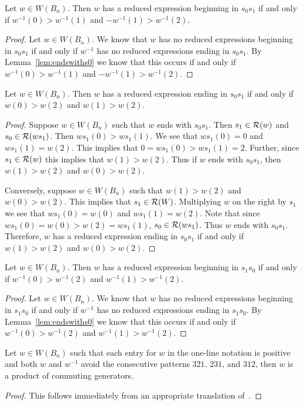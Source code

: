 \begin{corollary}\label{lem:beginswiths0}
	Let $w \in W(B_n)$. Then $w$ has a reduced expression beginning in $s_0s_1$ if and only if $w^{-1}(0)>w^{-1}(1)$ and $-w^{-1}(1)>w^{-1}(2)$.
	\begin{proof}
		Let $w \in W(B_n)$. We know that $w$ has no reduced expressions beginning in $s_0s_1$ if and only if $w^{-1}$ has no reduced expressions ending in $s_0s_1$. By Lemma~\ref{lem:endswiths0} we know that this occurs if and only if $w^{-1}(0)>w^{-1}(1)$ and $-w^{-1}(1)>w^{-1}(2)$.
	\end{proof}
\end{corollary}

\begin{lemma}\label{lem:endswiths_1}
Let $w \in W(B_n)$. Then $w$ has a reduced expression ending in $s_0s_1$ if and only if $w(0)>w(2)$ and $w(1)>w(2)$.
\begin{proof}
	Suppose $w \in W(B_n)$ such that $w$ ends with $s_0s_1$. Then $s_1 \in \mathcal{R}(w)$ and $s_0 \in \mathcal{R}(ws_1)$. Then $ws_1(0)>ws_1(1)$. We see that $ws_1(0)=0$ and $ws_1(1)=w(2)$. This implies that $0=ws_1(0)>ws_1(1)=2$. Further, since $s_1 \in \mathcal{R}(w)$ this implies that $w(1) > w(2)$. Thus if $w$ ends with $s_0s_1$, then $w(1)>w(2)$ and $w(0)>w(2)$.
	
	Conversely, suppose $w \in W(B_n)$ such that $w(1)>w(2)$ and $w(0)>w(2)$. This implies that $s_1 \in \mathcal{R}(W)$. Multiplying $w$ on the right by $s_1$ we see that $ws_1(0)=w(0)$ and $ws_1(1)=w(2)$. Note that since $ws_1(0)=w(0)>w(2)=ws_1(1)$, $s_0 \in \mathcal{R}(ws_1)$. Thus $w$ ends with $s_0s_1$. Therefore, $w$ has a reduced expression ending in $s_0s_1$ if and only if $w(1)>w(2)$ and $w(0)>w(2)$.
\end{proof}	
\end{lemma}

\begin{corollary}\label{lem:beginswiths1}
	Let $w \in W(B_n)$. Then $w$ has a reduced expression beginning in $s_1s_0$ if and only if $w^{-1}(0)>w^{-1}(2)$ and $w^{-1}(1)>w^{-1}(2)$.
	\begin{proof}
		Let $w \in W(B_n)$. We know that $w$ has no reduced expressions beginning in $s_1s_0$ if and only if $w^{-1}$ has no reduced expressions ending in $s_1s_0$. By Lemma~\ref{lem:endswiths0} we know that this occurs if and only if $w^{-1}(0)>w^{-1}(2)$ and $w^{-1}(1)>w^{-1}(2)$.
	\end{proof}
\end{corollary}

\begin{lemma}\label{lem:prodofcommA}
Let $w \in W(B_n)$ such that each entry for $w$ in the one-line notation is positive and both $w$ and $w^{-1}$ avoid the consecutive patterns $321$, $231$, and $312$, then $w$ is a product of commuting generators.
\begin{proof}
	This follows immediately from an appropriate translation of~\cite[Lemma 2.2.9]{Gern2013a}.
\end{proof}	
\end{lemma}

